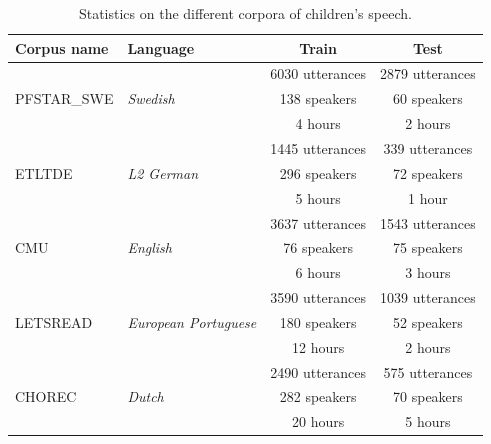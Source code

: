 \begin{table}[]
    \begin{center}

    \begin{tabular}{llcc}
    \hline
    Corpus name                  & Language                                      & Train           & Test            \\ \hline
    \multirow{3}{*}{PFSTAR\_SWE} & \multirow{3}{*}{\textit{Swedish}}             & 6030 utterances & 2879 utterances \\
                                 &                                               & 138 speakers    & 60 speakers     \\
                                 &                                               & 4 hours         & 2 hours         \\ \hline
    \multirow{3}{*}{ETLTDE}      & \multirow{3}{*}{\textit{L2 German}}           & 1445 utterances & 339 utterances  \\
                                 &                                               & 296  speakers   & 72 speakers     \\
                                 &                                               & 5 hours         & 1 hour          \\ \hline
    \multirow{3}{*}{CMU}         & \multirow{3}{*}{\textit{English}}             & 3637 utterances & 1543 utterances \\
                                 &                                               & 76 speakers     & 75 speakers     \\
                                 &                                               & 6 hours         & 3 hours         \\ \hline
    \multirow{3}{*}{LETSREAD}    & \multirow{3}{*}{\textit{European Portuguese}} & 3590 utterances & 1039 utterances \\
                                 &                                               & 180 speakers    & 52 speakers     \\
                                 &                                               & 12 hours        & 2 hours         \\ \hline
    \multirow{3}{*}{CHOREC}      & \multirow{3}{*}{\textit{Dutch}}               & 2490 utterances & 575 utterances  \\
                                 &                                               & 282 speakers    & 70 speakers     \\
                                 &                                               & 20 hours        & 5 hours         \\ \hline
    \end{tabular}
    \caption{Statistics on the different corpora of children's speech.}
\label{tab:statistics2}

\end{center}
    \end{table}

